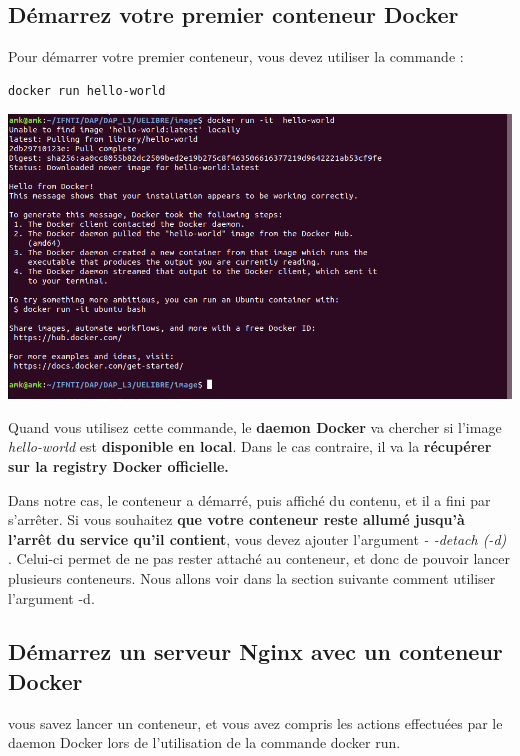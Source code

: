 \documentclass[12pt,a4paper]{article}
\begin{document}
\subsection{Démarrez votre premier conteneur Docker}
Pour démarrer votre premier conteneur, vous devez utiliser la commande :
\begin{verbatim}
docker run hello-world
\end{verbatim}
\begin{center}
\includegraphics[scale=0.3]{img/p_conteneur.png}
\end{center}
Quand vous utilisez cette commande, le \textbf{daemon Docker} va chercher si l'image \textit{hello-world} est \textbf{disponible en local}. Dans le cas contraire, il va la \textbf{récupérer sur la registry Docker officielle.}

Dans notre cas, le conteneur a démarré, puis affiché du contenu, et il a fini par s'arrêter. Si vous souhaitez \textbf{que votre conteneur reste allumé jusqu’à l'arrêt du service qu'il contient}, vous devez ajouter l’argument \textit{- -detach (-d)} . Celui-ci permet de ne pas rester attaché au conteneur, et donc de pouvoir lancer plusieurs conteneurs. Nous allons voir dans la section suivante comment utiliser l’argument -d.

\subsection{Démarrez un serveur Nginx avec un conteneur Docker}
vous savez lancer un conteneur, et vous avez compris les actions effectuées par le daemon Docker lors de l'utilisation de la commande docker run.
\end{document}
